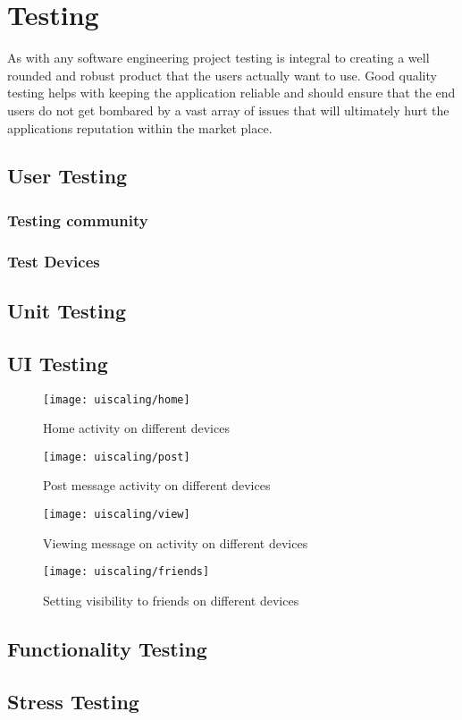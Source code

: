 \chapter{Testing}

As with any software engineering project testing is integral to creating a well rounded and robust product that the users actually want to use. Good quality testing helps with keeping the application reliable and should ensure that the end users do not get bombared by a vast array of issues that will ultimately hurt the applications reputation within the market place.

\section{User Testing}

\subsection{Testing community}

\subsection{Test Devices}


\section{Unit Testing}

\section{UI Testing}

\begin{figure}[h]
    \centering
    \texttt{[image: uiscaling/home]}
    \caption{Home activity on different devices}
    \label{fig:ui_scaling_home_image}
\end{figure} 
\noindent

\begin{figure}[h]
    \centering
    \texttt{[image: uiscaling/post]}
    \caption{Post message activity on different devices}
    \label{fig:ui_scaling_post_image}
\end{figure} 
\noindent

\begin{figure}[h]
    \centering
    \texttt{[image: uiscaling/view]}
    \caption{Viewing message on activity on different devices}
    \label{fig:ui_scaling_view_image}
\end{figure} 
\noindent

\begin{figure}[h]
    \centering
    \texttt{[image: uiscaling/friends]}
    \caption{Setting visibility to friends on different devices}
    \label{fig:ui_scaling_friends_image}
\end{figure} 
\noindent

\section{Functionality Testing}

\section{Stress Testing}

